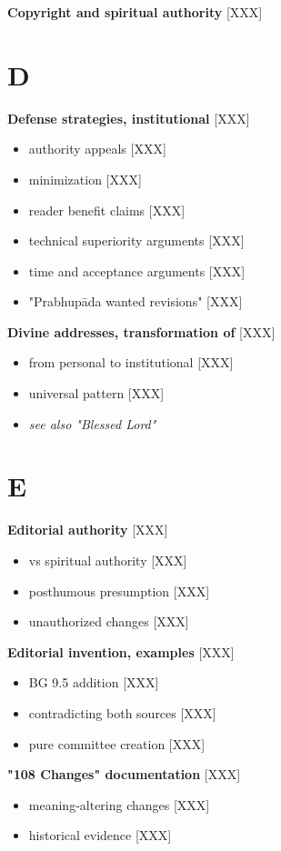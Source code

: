 \documentclass[11pt,twoside]{book}
\begin{document}
\textbf{\textbf{Copyright and spiritual authority}} {[}XXX]
\section*{D}
\label{sec:orgcffe654}

\textbf{\textbf{Defense strategies, institutional}} {[}XXX]
\begin{itemize}
\item authority appeals [XXX]
\item minimization [XXX]
\item reader benefit claims [XXX]
\item technical superiority arguments [XXX]
\item time and acceptance arguments [XXX]
\item "Prabhupāda wanted revisions" [XXX]
\end{itemize}

\textbf{\textbf{Divine addresses, transformation of}} {[}XXX]
\begin{itemize}
\item from personal to institutional [XXX]
\item universal pattern [XXX]
\item \emph{see also "Blessed Lord"}
\end{itemize}
\section*{E}
\label{sec:org88b8f11}

\textbf{\textbf{Editorial authority}} {[}XXX]
\begin{itemize}
\item vs spiritual authority [XXX]
\item posthumous presumption [XXX]
\item unauthorized changes [XXX]
\end{itemize}

\textbf{\textbf{Editorial invention, examples}} {[}XXX]
\begin{itemize}
\item BG 9.5 addition [XXX]
\item contradicting both sources [XXX]
\item pure committee creation [XXX]
\end{itemize}

\textbf{\textbf{"108 Changes" documentation}} {[}XXX]
\begin{itemize}
\item meaning-altering changes [XXX]
\item historical evidence [XXX]
\end{itemize}
\end{document}
